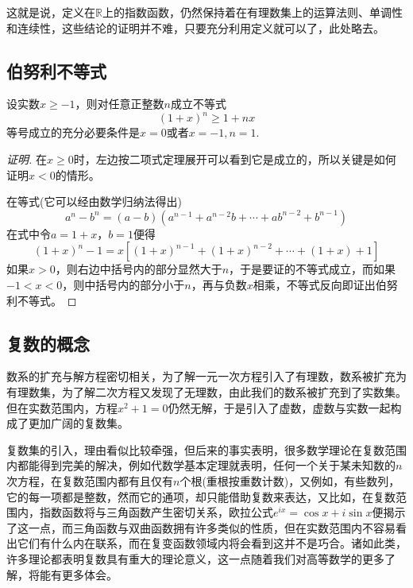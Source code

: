 这就是说，定义在$\mathbb{R}$上的指数函数，仍然保持着在有理数集上的运算法则、单调性和连续性，这些结论的证明并不难，只要充分利用定义就可以了，此处略去。

\subsection{伯努利不等式}
\label{sec:bernoulli-inequality}

\begin{theorem}
  \label{theorem:bernoulli-inequality}
  设实数$x \geqslant -1$，则对任意正整数$n$成立不等式
  \begin{equation}
    \label{eq:bernoulli-inequality}
   (1+x)^n \geqslant 1+nx 
 \end{equation}
 等号成立的充分必要条件是$x=0$或者$x=-1,n=1$.
\end{theorem}

\begin{proof}[证明]
  在$x \geqslant 0$时，左边按二项式定理展开可以看到它是成立的，所以关键是如何证明$x<0$的情形。

  在等式(它可以经由数学归纳法得出)
  \[ a^n-b^n = (a-b)(a^{n-1}+a^{n-2}b+\cdots+ab^{n-2}+b^{n-1}) \]
  在式中令$a=1+x$，$b=1$便得
  \[ (1+x)^n-1=x \left[ (1+x)^{n-1}+(1+x)^{n-2}+\cdots+(1+x)+1 \right] \]
  如果$x>0$，则右边中括号内的部分显然大于$n$，于是要证的不等式成立，而如果$-1<x<0$，则中括号内的部分小于$n$，再与负数$x$相乘，不等式反向即证出伯努利不等式。
\end{proof}

\subsection{复数的概念}
\label{sec:import-complex-number}



数系的扩充与解方程密切相关，为了解一元一次方程引入了有理数，数系被扩充为有理数集，为了解二次方程又发现了无理数，由此我们的数系被扩充到了实数集。但在实数范围内，方程$x^2+1=0$仍然无解，于是引入了虚数，虚数与实数一起构成了更加广阔的复数集。

复数集的引入，理由看似比较牵强，但后来的事实表明，很多数学理论在复数范围内都能得到完美的解决，例如代数学基本定理就表明，任何一个关于某未知数的$n$次方程，在复数范围内都有且仅有$n$个根(重根按重数计数)，又例如，有些数列，它的每一项都是整数，然而它的通项，却只能借助复数来表达，又比如，在复数范围内，指数函数将与三角函数产生密切关系，欧拉公式$e^{ix}=\cos{x}+i\sin{x}$便揭示了这一点，而三角函数与双曲函数拥有许多类似的性质，但在实数范围内不容易看出它们有什么内在联系，而在复变函数领域内将会看到这并不是巧合。诸如此类，许多理论都表明复数具有重大的理论意义，这一点随着我们对高等数学的更多了解，将能有更多体会。


